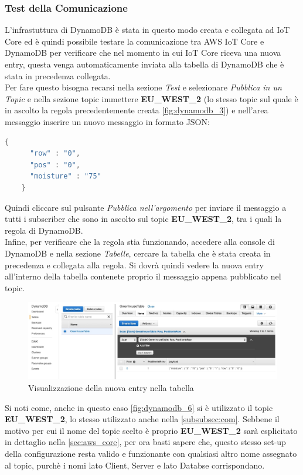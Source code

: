 \subsubsection{Test della Comunicazione}
L'infrastuttura di DynamoDB è stata in questo modo creata e collegata ad IoT Core ed è quindi possibile testare la comunicazione tra AWS IoT Core e DynamoDB per verificare che nel momento in cui IoT Core riceva una nuova entry, questa venga automaticamente inviata alla tabella di DynamoDB che è stata in precedenza collegata. \\
Per fare questo bisogna recarsi nella sezione \textit{Test} e selezionare \textit{Pubblica in un Topic} e nella sezione topic immettere \textbf{EU\_WEST\_2} (lo stesso topic sul quale è in ascolto la regola precedentemente creata \autoref{fig:dynamodb_3}) e nell'area messaggio inserire un nuovo messaggio in formato JSON:
\begin{lstlisting}[language=Java, label= code:JSON_message, caption=Esempio di un possibile messaggio in formato JSON da salvare nel database]
	{
	  "row" : "0",
	  "pos" : "0",
	  "moisture" : "75"
	}
\end{lstlisting}
Quindi cliccare sul pulsante \textit{Pubblica nell'argomento} per inviare il messaggio a tutti i subscriber che sono in ascolto sul topic \textbf{EU\_WEST\_2}, tra i quali la regola di DynamoDB.\\
Infine, per verificare che la regola stia funzionando, accedere alla console di DynamoDB e nella sezione \textit{Tabelle}, cercare la tabella che è stata creata in precedenza e collegata alla regola. Si dovrà quindi vedere la nuova entry all'interno della tabella contenete proprio il messaggio appena pubblicato nel topic.\\
\begin{figure}
	\begin{center}
		\includegraphics[width=1\columnwidth]{images/dynamodb_6}
	\end{center}
	\caption{Visualizzazione della nuova entry nella tabella}
	\label{fig:dynamodb_6}
\end{figure}
Si noti come, anche in questo caso \autoref{fig:dynamodb_6} si è utilizzato il topic \textbf{EU\_WEST\_2}, lo stesso utilizzato anche nella \autoref{subsubsec:com}. Sebbene il motivo per cui il nome del topic scelto è proprio \textbf{EU\_WEST\_2} sarà esplicitato in dettaglio nella \autoref{sec:aws_core}, per ora basti sapere che, questo stesso set-up della configurazione resta valido e funzionante con qualsiasi altro nome assegnato al topic, purchè i nomi lato Client, Server e lato Databse corrispondano.

